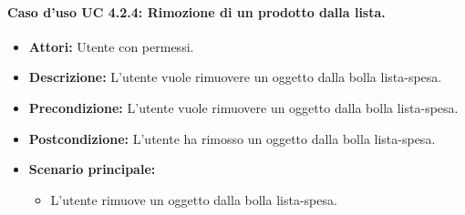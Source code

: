 \paragraph{Caso d'uso UC 4.2.4: Rimozione di un prodotto dalla lista.}
\label{Caso d'uso UC 4.2.4: Rimozione di un prodotto dalla lista.}

\FloatBarrier
\begin{itemize}
\item \textbf{Attori:} Utente con permessi.
\item \textbf{Descrizione:} L'utente vuole rimuovere un oggetto dalla bolla lista-spesa.
\item \textbf{Precondizione:} L'utente vuole rimuovere un oggetto dalla bolla lista-spesa. 
\item \textbf{Postcondizione:} L'utente ha rimosso un oggetto dalla bolla lista-spesa.
\item \textbf{Scenario principale:}
	\begin{itemize}
	\item{L'utente rimuove un oggetto dalla bolla lista-spesa.}
	\end{itemize}
\end{itemize}